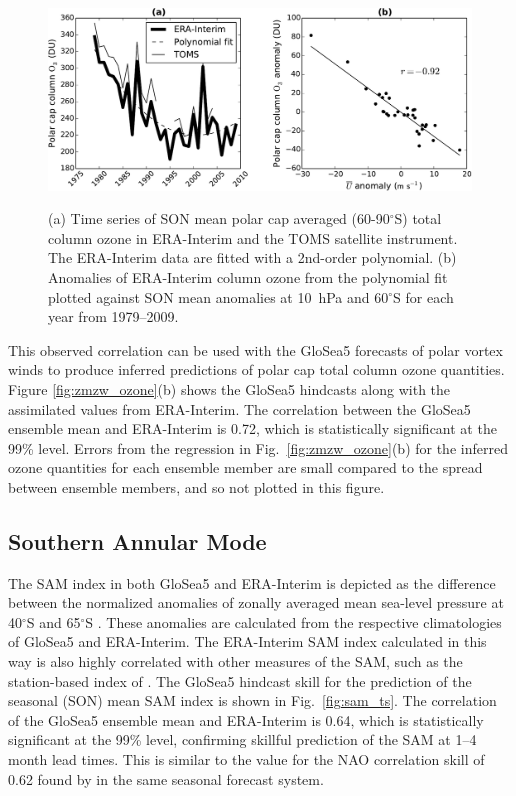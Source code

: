\begin{figure}[t]
  \noindent\includegraphics[width=\textwidth,angle=0]{figures/chapter-seasonal/zmzw_ozone_scatter_crop.pdf}\\
  \caption[Relation between stratospheric polar vortex strenth and column
ozone.]{(a) Time series of SON mean polar cap averaged (60-90$^{\circ}$S) total
column ozone in ERA-Interim and the TOMS satellite instrument. The ERA-Interim
data are fitted with a 2nd-order polynomial. (b) Anomalies of ERA-Interim column
ozone from the polynomial fit plotted against SON mean anomalies at 10~hPa and
60$^{\circ}$S for each year from 1979--2009.} \label{fig:zmzw_scatter}
\end{figure}

This observed correlation can be used with the GloSea5 forecasts of polar vortex
winds to produce inferred predictions of polar cap total column ozone
quantities. Figure \ref{fig:zmzw_ozone}(b) shows the GloSea5 hindcasts along
with the assimilated values from ERA-Interim. The correlation between the
GloSea5 ensemble mean and ERA-Interim is 0.72, which is statistically
significant at the 99\% level. Errors from the regression in Fig.\
\ref{fig:zmzw_ozone}(b) for the inferred ozone quantities for each ensemble
member are small compared to the spread between ensemble members, and so not
plotted in this figure.

\subsection{Southern Annular Mode}

The SAM index in both GloSea5 and ERA-Interim is depicted as the difference
between the normalized anomalies of zonally averaged mean sea-level pressure at
40$^{\circ}$S and 65$^{\circ}$S \citep{Gong1999}. These anomalies are calculated
from the respective climatologies of GloSea5 and ERA-Interim. The ERA-Interim
SAM index calculated in this way is also highly correlated with other measures
of the SAM, such as the station-based index of \citet{Marshall2003}. The GloSea5
hindcast skill for the prediction of the seasonal (SON) mean SAM index is shown
in Fig.\ \ref{fig:sam_ts}. The correlation of the GloSea5 ensemble mean and
ERA-Interim is 0.64, which is statistically significant at the 99\% level,
confirming skillful prediction of the SAM at 1--4 month lead times. This is
similar to the value for the NAO correlation skill of 0.62 found by
\citet{Scaife2013} in the same seasonal forecast system.

